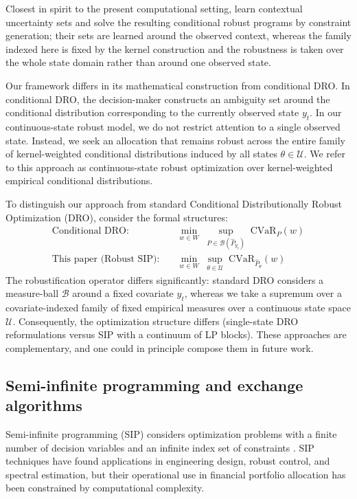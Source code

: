 \documentclass[smallcondensed]{svjour3}
\begin{document}
Closest in spirit to the present computational setting, \cite{chenreddy2022conditional} learn contextual uncertainty sets and solve the resulting conditional robust programs by constraint generation; their sets are learned around the observed context, whereas the family indexed here is fixed by the kernel construction and the robustness is taken over the whole state domain rather than around one observed state.

Our framework differs in its mathematical construction from conditional DRO. In conditional DRO, the decision-maker constructs an ambiguity set around the conditional distribution corresponding to the currently observed state $y_t$. In our continuous-state robust model, we do not restrict attention to a single observed state. Instead, we seek an allocation that remains robust across the entire family of kernel-weighted conditional distributions induced by all states $\theta \in \mathcal{U}$. We refer to this approach as continuous-state robust optimization over kernel-weighted empirical conditional distributions.


To distinguish our approach from standard Conditional Distributionally Robust Optimization (DRO), consider the formal structures:
\begin{align}
\text{Conditional DRO:} &\quad \min_{w \in W}\;\sup_{P \in \mathcal{B}(\hat{P}_{y_t})}\; \mathrm{CVaR}_{P}(w) \label{eq:dro_contrast} \\
\text{This paper (Robust SIP):} &\quad \min_{w \in W}\;\sup_{\theta \in \mathcal{U}}\; \mathrm{CVaR}_{\hat{P}_\theta}(w) \label{eq:sip_contrast}
\end{align}
The robustification operator differs significantly: standard DRO considers a measure-ball $\mathcal{B}$ around a fixed covariate $y_t$, whereas we take a supremum over a covariate-indexed family of fixed empirical measures over a continuous state space $\mathcal{U}$. Consequently, the optimization structure differs (single-state DRO reformulations versus SIP with a continuum of LP blocks). These approaches are complementary, and one could in principle compose them in future work.

\subsection{Semi-infinite programming and exchange algorithms}
Semi-infinite programming (SIP) considers optimization problems with a finite number of decision variables and an infinite index set of constraints \cite{hettich1993semi, lopez2007semi}. SIP techniques have found applications in engineering design, robust control, and spectral estimation, but their operational use in financial portfolio allocation has been constrained by computational complexity.
\end{document}
